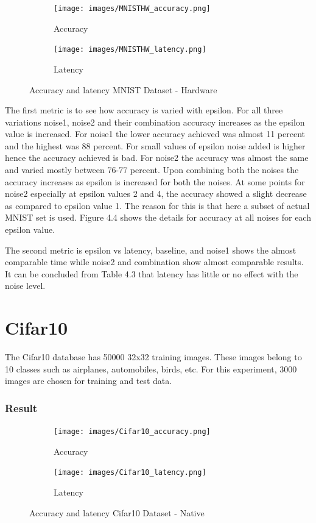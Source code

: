 \begin{figure}
     \begin{subfigure}{0.5\textwidth}
         \texttt{[image: images/MNISTHW\_accuracy.png]}
         \caption{Accuracy}
         \label{default}
     \end{subfigure}
     \begin{subfigure}{0.5\textwidth}
         \texttt{[image: images/MNISTHW\_latency.png]}
         \caption{Latency}
         \label{default}
     \end{subfigure}
        \caption{Accuracy and latency MNIST Dataset - Hardware}
        \label{default}
\end{figure}

The first metric is to see how accuracy is varied with epsilon. For all three variations noise1, noise2 and their combination accuracy increases as the epsilon value is increased. For noise1 the lower accuracy achieved was almost 11 percent and the highest was 88 percent. For small values of epsilon noise added is higher hence the accuracy achieved is bad. For noise2 the accuracy was almost the same and varied mostly between 76-77 percent. Upon combining both the noises the accuracy increases as epsilon is increased for both the noises. At some points for noise2 especially at epsilon values 2 and 4, the accuracy showed a slight decrease as compared to epsilon value 1. The reason for this is that here a subset of actual MNIST set is used. Figure 4.4 shows the details for accuracy at all noises for each epsilon value.

The second metric is epsilon vs latency, baseline, and noise1 shows the almost comparable time while noise2 and combination show almost comparable results. It can be concluded from Table 4.3 that latency has little or no effect with the noise level.

\section{Cifar10}
The Cifar10 database\cite{13} has 50000 32x32 training images. These images belong to 10 classes such as airplanes, automobiles, birds, etc. For this experiment, 3000 images are chosen for training and test data.
\subsubsection{Result}
\begin{figure}
     \begin{subfigure}{0.5\textwidth}
         \texttt{[image: images/Cifar10\_accuracy.png]}
         \caption{Accuracy}
         \label{default}
     \end{subfigure}
     \begin{subfigure}{0.5\textwidth}
         \texttt{[image: images/Cifar10\_latency.png]}
         \caption{Latency}
         \label{default}
     \end{subfigure}
        \caption{Accuracy and latency Cifar10 Dataset - Native}
        \label{default}
\end{figure}

